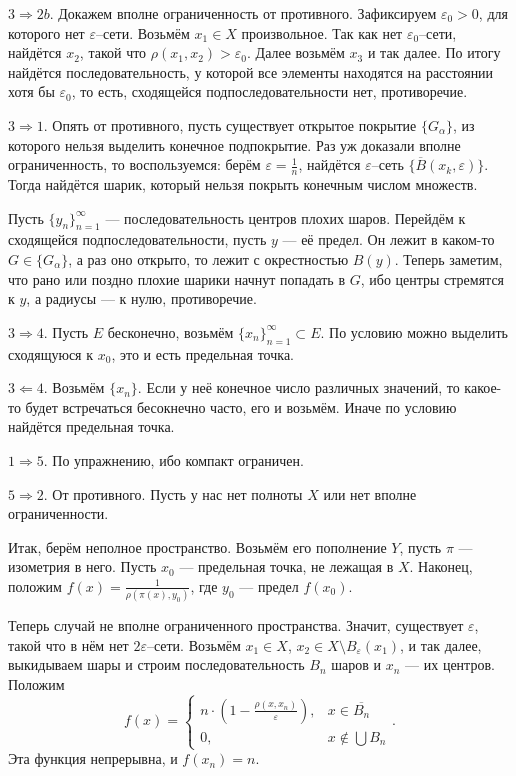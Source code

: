 $3 \Rightarrow 2b$. Докажем вполне ограниченность от противного.
Зафиксируем $\varepsilon_0 > 0$, для которого нет $\varepsilon$--сети.
Возьмём $x_1 \in X$ произвольное.
Так как нет $\varepsilon_0$--сети, найдётся $x_2$, такой что $\rho(x_1, x_2) > \varepsilon_0$.
Далее возьмём $x_3$ и так далее.
По итогу найдётся последовательность, у которой все элементы находятся на расстоянии хотя бы $\varepsilon_0$, то есть, сходящейся подпоследовательности нет, противоречие.

$3 \Rightarrow 1$. Опять от противного, пусть существует открытое покрытие $\{G_\alpha\}$, из которого нельзя выделить конечное подпокрытие.
Раз уж доказали вполне ограниченность, то воспользуемся: берём $\varepsilon = \frac{1}{n}$, найдётся $\varepsilon$--сеть $\{\overline B(x_k, \varepsilon)\}$.
Тогда найдётся шарик, который нельзя покрыть конечным числом множеств.

Пусть $\{y_n\}_{n=1}^\infty$ --- последовательность центров плохих шаров.
Перейдём к сходящейся подпоследовательности, пусть $y$ --- её предел.
Он лежит в каком-то $G \in \{G_\alpha\}$, а раз оно открыто, то лежит с окрестностью $B(y)$.
Теперь заметим, что рано или поздно плохие шарики начнут попадать в $G$, ибо центры стремятся к $y$, а радиусы --- к нулю, противоречие.

$3 \Rightarrow 4$. Пусть $E$ бесконечно, возьмём $\{x_n\}_{n=1}^\infty \subset E$.
По условию можно выделить сходящуюся к $x_0$, это и есть предельная точка.

$3 \Leftarrow 4$. Возьмём $\{x_n\}$. Если у неё конечное число различных значений, то какое-то будет встречаться бесокнечно часто, его и возьмём.
Иначе по условию найдётся предельная точка.

$1 \Rightarrow 5$. По упражнению, ибо компакт ограничен.

$5 \Rightarrow 2$. От противного. Пусть у нас нет полноты $X$ или нет вполне ограниченности.

Итак, берём неполное пространство.
Возьмём его пополнение $Y$, пусть $\pi$ --- изометрия в него.
Пусть $x_0$ --- предельная точка, не лежащая в $X$.
Наконец, положим $f(x) = \frac{1}{\rho(\pi(x), y_0)}$, где $y_0$ --- предел $f(x_0)$.

Теперь случай не вполне ограниченного пространства.
Значит, существует $\varepsilon$, такой что в нём нет $2 \varepsilon$--сети.
Возьмём $x_1 \in X$, $x_2 \in X \setminus B_{\varepsilon}(x_1)$, и так далее, выкидываем шары и строим последовательность $B_n$ шаров и $x_n$ --- их центров.
Положим
\[
    f(x) =
    \begin{cases}
        n \cdot \left( 1 - \frac{\rho(x, x_n)}{\varepsilon} \right), & x \in \overline{B_n} \\
        0, & x \not\in \bigcup B_n
    \end{cases} .
\]
Эта функция непрерывна, и $f(x_n) = n$.

